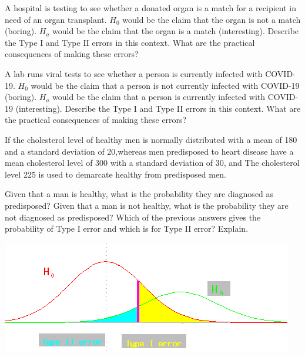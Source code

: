 

\clearpage

\bb[resume]
\ii A hospital is testing to see whether a donated organ is a match for a recipient in need of an organ transplant. $H_0$ would be the claim that the organ is not a match (boring). $H_a$ would be the claim that the organ is a match (interesting). Describe the Type I and Type II errors in this context. What are the practical consequences of making these errors?

\vfill

\ii A lab runs viral tests to see whether a person is currently infected with COVID-19. $H_0$ would be the claim that a person is not currently infected with COVID-19 (boring). $H_a$ would be the claim that a person is currently infected with COVID-19 (interesting). Describe the Type I and Type II errors in this context. What are the practical consequences of making these errors?

\vfill

\ii If the cholesterol level of healthy men is normally distributed with a mean of 180 and a standard deviation of 20,whereas
men predisposed to heart disease have a mean cholesterol level of 300 with a standard deviation of 30, and
The cholesterol level 225 is used to demarcate healthy from predisposed men. %

\bb
\ii Given that a man is healthy, what is the probability they are diagnosed as predisposed? \vfill
\ii Given that a man is not healthy, what is the probability they are not diagnosed as predisposed? \vfill
\ii Which of the previous answers gives the probability of Type I error and which is for Type II error? Explain. \vspace{1in}
\ee


\clearpage

\begin{center}
\includegraphics[width=0.75\tw]{22/fig-dist-error-types.png}
\end{center}


